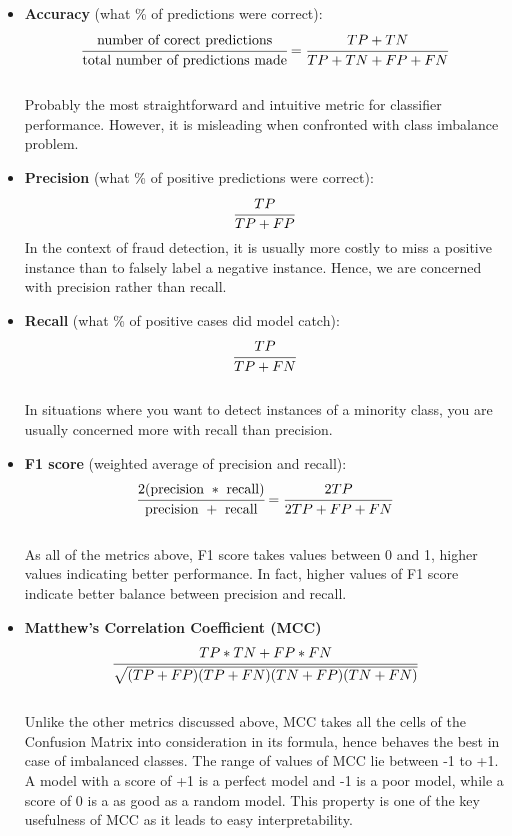     \begin{itemize}
        \item \textbf{Accuracy} (what \% of predictions were correct): $$ \cfrac{\text{number of corect predictions}}{\text{total number of predictions made}} = \cfrac{TP + TN}{TP + TN + FP + FN}$$ \\
        Probably the most straightforward and intuitive metric for classifier performance. However, it is misleading when confronted with class imbalance problem. \\
        
        \item \textbf{Precision} (what \% of positive predictions were correct): $$ \cfrac{TP}{TP + FP}$$ 
        In the context of fraud detection, it is usually more costly to miss a positive instance than to falsely label a negative instance. Hence, we are concerned with precision rather than recall. \\
        
        \item \textbf{Recall} (what \% of positive cases did model catch): $$ \cfrac{TP}{TP + FN}$$ \\
        In situations where you want to detect instances of a minority class, you are usually concerned more with recall than precision. \\
        
        \item \textbf{F1 score} (weighted average of precision and recall): $$ \cfrac{2(\text{precision} \ * \ \text{recall})}{\text{precision} \ + \ \text{recall}} = \cfrac{2TP}{2TP + FP + FN}$$ \\
        As all of the metrics above, F1 score takes values between 0 and 1, higher values indicating better performance. In fact, higher values of F1 score indicate better balance between precision and recall. \\ 
        
        \item \textbf{Matthew's Correlation Coefficient (MCC)} $$ \cfrac{TP * TN + FP * FN}{\sqrt{(TP + FP)(TP + FN)(TN + FP)(TN + FN)}}$$ \\
        Unlike the other metrics discussed above, MCC takes all the cells of the Confusion Matrix into consideration in its formula, hence behaves the best in case of imbalanced classes. The range of values of MCC lie between -1 to +1. A model with a score of +1 is a perfect model and -1 is a poor model, while a score of 0 is a as good as a random model. This property is one of the key usefulness of MCC as it leads to easy interpretability. \\
    \end{itemize}
    
